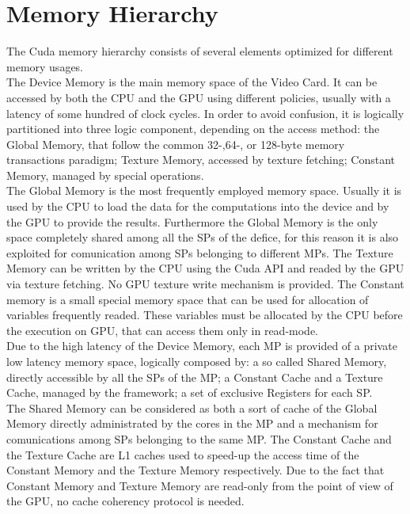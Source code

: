 \section{Memory Hierarchy}
The Cuda memory hierarchy consists of several elements optimized for different memory usages.\\
The Device Memory is the main memory space of the Video Card. It can be accessed by both the CPU and the GPU using different policies, usually with a latency of some hundred of clock cycles. In order to avoid confusion, it is logically partitioned into three logic component, depending on the access method: the Global Memory, that follow the common 32-,64-, or 128-byte memory transactions paradigm; Texture Memory, accessed by texture fetching; Constant Memory, managed by special operations.\\
The Global Memory is the most frequently employed memory space. Usually it is used by the CPU to load the data for the computations into the device and by the GPU to provide the results. Furthermore the Global Memory is the only space completely shared among all the SPs of the defice, for this reason it is also exploited for comunication among SPs belonging to different MPs. The Texture Memory can be written by the CPU using the Cuda API and readed by the GPU via texture fetching. No GPU texture write mechanism is provided. The Constant memory is a small special memory space that can be used for allocation of variables frequently readed. These variables must be allocated by the CPU before the execution on GPU, that can access them only in read-mode.\\ 
Due to the high latency of the Device Memory, each MP is provided of a private low latency memory space, logically composed by: a so called Shared Memory, directly accessible by all the SPs of the MP; a Constant Cache and a Texture Cache, managed by the framework; a set of exclusive Registers for each SP.\\
The Shared Memory can be considered as both a sort of cache of the Global Memory directly administrated by the cores in the MP and a mechanism for comunications among SPs belonging to the same MP. The Constant Cache and the Texture Cache are L1 caches used to speed-up the access time of the Constant Memory and the Texture Memory respectively. Due to the fact that Constant Memory and Texture Memory are read-only from the point of view of the GPU, no cache coherency protocol is needed.\\ 

